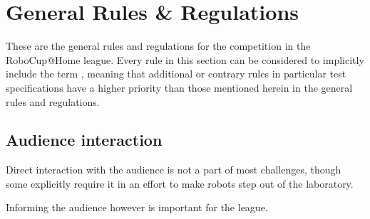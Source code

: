 \chapter{General Rules \& Regulations}
\label{chap:rules}

These are the general rules and regulations for the competition in the RoboCup@Home league.
Every rule in this section can be considered to implicitly include the
term \emph{}, meaning that additional or contrary rules in particular
test specifications have a higher priority than those mentioned herein in the general rules and regulations.



\section{Audience interaction}
Direct interaction with the audience is not a part of most challenges, though some explicitly require it in an effort to make robots step out of the laboratory.

Informing the audience however is important for the league.






% 
















